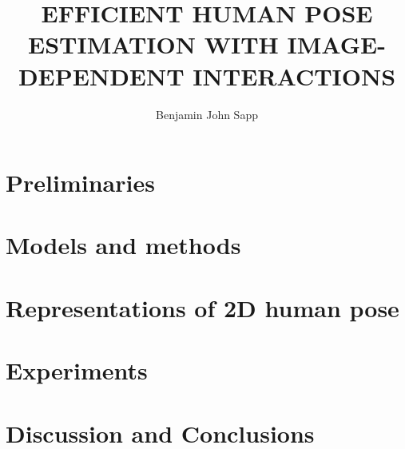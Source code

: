 \documentclass[12pt]{report}%
\theoremstyle{plain} \newtheorem{problem}{Problem}
\begin{document}

\newcommand{\mytitle}{Efficient Human Pose Estimation with Image-dependent 
Interactions}
\newcommand{\MYTITLE}{EFFICIENT HUMAN POSE ESTIMATION WITH IMAGE-DEPENDENT 
INTERACTIONS}

\title{\MYTITLE}
\author{Benjamin John Sapp}


  

 \beforepreface
\newpage
\copyrightpage
\clearpage

\clearpage


\abstractp

\tocstuff


\newpage
{}
\pagestyle{plain}
%

\part{Preliminaries}



%
\clearpage
\part{Models and methods}



%
\clearpage
\part{Representations of 2D human pose}

%
\clearpage
\part{Experiments}\label{sec:experiments}


%
\clearpage
\part{Discussion and Conclusions}

%
\clearpage
\appendix


%
\clearpage


%
\end{document}
